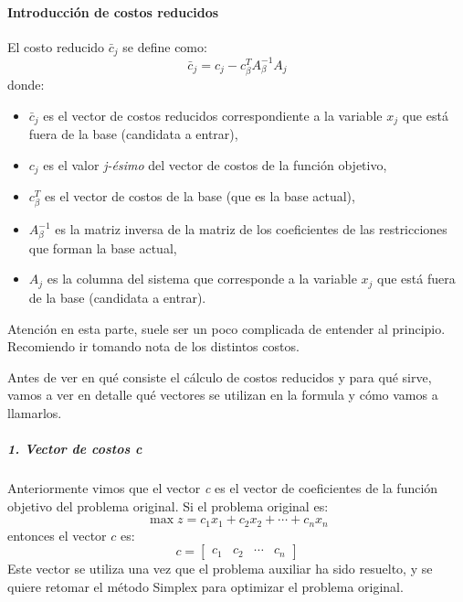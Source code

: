 \paragraph{Introducción de costos reducidos}

El costo reducido \(\bar{c}_j\) se define como:
\[
  \bar{c}_j = c_j - c_\beta^T A_\beta^{-1} A_j
\]
donde:
\begin{itemize}
  \item \(\bar{c}_j\) es el vector de costos reducidos correspondiente a la variable \(x_j\) que está fuera de la base (candidata a entrar),
  \item \(c_j\) es el valor \textit{j-ésimo} del vector de costos de la función objetivo,
  \item \(c_\beta^T\) es el vector de costos de la base (que es la base actual),
  \item \(A_\beta^{-1}\) es la matriz inversa de la matriz de los coeficientes de las restricciones que forman la base actual,
  \item \(A_j\) es la columna del sistema que corresponde a la variable \(x_j\) que está fuera de la base (candidata a entrar).
\end{itemize}

\begin{tcolorbox}[mydanger]
  Atención en esta parte, suele ser un poco complicada de entender al principio. Recomiendo ir tomando nota de los distintos costos.
\end{tcolorbox}

Antes de ver en qué consiste el cálculo de costos reducidos y para qué sirve, vamos a ver en detalle qué vectores se utilizan en la formula y cómo vamos a llamarlos.

\vspace{5mm}

\subparagraph{1. Vector de costos \textit{c}}

Anteriormente vimos que el vector \textit{c} es el vector de coeficientes de la función objetivo del problema original. Si el problema original es:
\[
  \max z = c_1 x_1 + c_2 x_2 + \cdots + c_n x_n
\]
entonces el vector \(c\) es:
\[
  c = \begin{bmatrix} c_1 & c_2 & \cdots & c_n \end{bmatrix}
\]
Este vector se utiliza una vez que el problema auxiliar ha sido resuelto, y se quiere retomar el método Simplex para optimizar el problema original.

\vspace{5mm}

